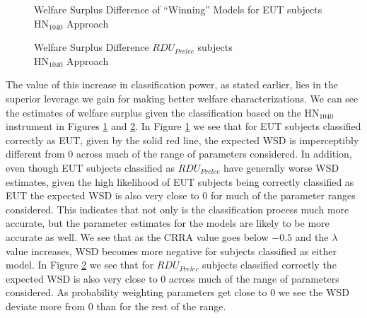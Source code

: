 \documentclass[../main.tex]{subfiles}
\begin{document}
\begin{figure}[h!]
	\center
	\caption{Welfare Surplus Difference of \enquote{Winning} Models for EUT subjects\\$\text{HN}_{1040}$ Approach}
	\label{fig:HN_wel_eut}
\end{figure}

\begin{figure}[h!]
	\center
	\caption{Welfare Surplus Difference $\mathit{RDU_{Prelec}}$ subjects\\$\text{HN}_{1040}$ Approach}
	\label{fig:HN_wel_pre}
\end{figure}

The value of this increase in classification power, as stated earlier, lies in the superior leverage we gain for making better welfare characterizations.
We can see the estimates of welfare surplus given the classification based on the $\text{HN}_{1040}$ instrument in Figures \ref{fig:HN_wel_eut} and \ref{fig:HN_wel_pre}.
In Figure \ref{fig:HN_wel_eut} we see that for EUT subjects classified correctly as EUT, given by the solid red line, the expected WSD is imperceptibly different from 0 across much of the range of parameters considered.
In addition, even though EUT subjects classified as $\mathit{RDU_{Prelec}}$ have generally worse WSD estimates, given the high likelihood of EUT subjects being correctly classified as EUT the expected WSD is also very close to 0 for much of the parameter ranges considered.
This indicates that not only is the classification process much more accurate, but the parameter estimates for the models are likely to be more accurate as well.
We see that as the CRRA value goes below $-0.5$ and the $\lambda$ value increases, WSD becomes more negative for subjects classified as either model.
In Figure \ref{fig:HN_wel_pre} we see that for $\mathit{RDU_{Prelec}}$ subjects classified correctly the expected WSD is also very close to 0 across much of the range of parameters considered.
As probability weighting parameters get close to 0 we see the WSD deviate more from 0 than for the rest of the range. 
\end{document}
